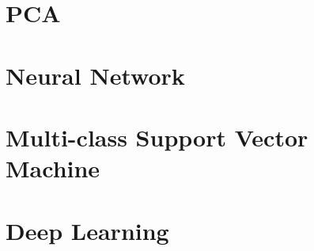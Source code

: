 \documentclass{article} %
\begin{document}
\newpage
\appendix
\section{PCA}
\section{Neural Network}
\section{Multi-class Support Vector Machine}
\section{Deep Learning}
\end{document}
